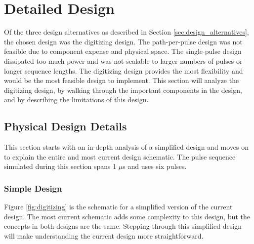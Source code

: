 \documentclass[pdftex,12pt,a4paper]{article}
\begin{document}
\section{Detailed Design}
\label{sec:detailed_design}

Of the three design alternatives as described in Section  \ref{sec:design_alternatives}, the chosen design was the digitizing design. The path-per-pulse design was not feasible due to component expense and physical space. The single-pulse design dissipated too much power and was not scalable to larger numbers of pulses or longer sequence  lengths. The digitizing design provides the most flexibility and would be the most feasible design to implement. This section will analyze the digitizing design, by walking through the important components in the design, and by describing the limitations of this design.

    
\subsection{Physical Design Details}
This section starts with an in-depth analysis of a simplified design and moves on to explain the entire and most current design schematic. The pulse sequence simulated during this section spans 1 $\mu$s and uses six pulses. 

\subsubsection{Simple Design} 
\label{sec:simple_walkthrough}
Figure \ref{fig:digitizing} is the schematic for a simplified version of the current design. The most current schematic adds some complexity to this design, but the concepts in both designs are the same. Stepping through this simplified design will make understanding the current design more straightforward. 
\end{document}
